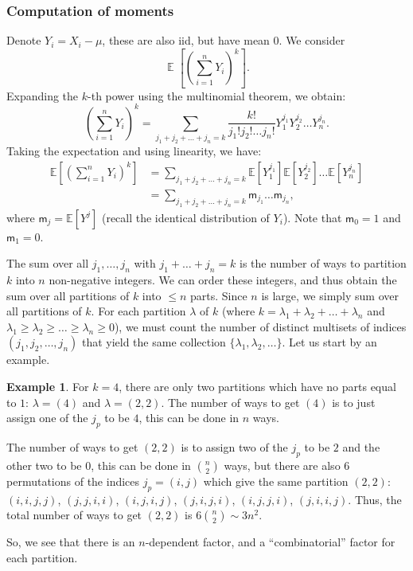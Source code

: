 \documentclass[letterpaper,11pt,oneside,reqno]{article}
\numberwithin{equation}{section}
\theoremstyle{definition}
\newtheorem{example}[proposition]{Example}
\begin{document}
\subsubsection{Computation of moments}

Denote $Y_i=X_i-\mu$, these are also iid, but have mean $0$.
We consider
\begin{equation*}
	\operatorname{\mathbb{E}}\left[ \left( \sum_{i=1}^n Y_i \right)^k \right].
\end{equation*}
Expanding the $k$-th power using the multinomial theorem, we obtain:
\begin{equation*}
\left( \sum_{i=1}^n Y_i \right)^k = \sum_{j_1 + j_2 + \dots + j_n = k} \frac{k!}{j_1! j_2! \dots j_n!} Y_1^{j_1} Y_2^{j_2} \dots Y_n^{j_n}.
\end{equation*}
Taking the expectation and using linearity, we have:
\begin{align*}
 \mathbb{E}\left[ \left( \sum_{i=1}^n Y_i \right)^k \right]
 &=
 \sum_{j_1 + j_2 + \dots + j_n = k}
 \mathbb{E}\left[Y_1^{j_1}\right]
 \mathbb{E}\left[Y_2^{j_2}\right] \dots
 \mathbb{E}\left[Y_n^{j_n}\right] \\
 &=
 \sum_{j_1 + j_2 + \dots + j_n = k}
 \mathsf{m}_{j_1}\ldots \mathsf{m}_{j_n},
\end{align*}
where $\mathsf{m}_j=\mathbb{E}[Y^j]$ (recall the identical distribution of $Y_i$).
Note that
$\mathsf{m}_0 = 1$ and
$\mathsf{m}_1 = 0$.

The sum over all $j_1, \ldots, j_n$ with $j_1 + \ldots + j_n = k$ is the number of ways to partition $k$ into $n$ non-negative integers.
We can order these integers, and thus
obtain the sum over all partitions of $k$ into $\le n$ parts.
Since $n$ is large, we simply sum over all partitions of $k$.
For each partition $\lambda$ of $k$
(where $k=\lambda_1+\lambda_2+\ldots+\lambda_n $ and
$\lambda_1\geq \lambda_2\geq \ldots\geq \lambda_n\geq 0$),
we must count the number of distinct multisets of indices
\((j_1,j_2,\ldots,j_n)\) that yield the same collection
\(\{\lambda_1,\lambda_2,\ldots\}\). Let us start by an
example.
\begin{example}
	For $k=4$, there are only two partitions
	which have no parts equal to $1$:
	$\lambda=(4)$ and $\lambda=(2,2)$.
	The number of ways to get $(4)$ is to just
	assign one of the $j_p$ to be $4$,
	this can be done in $n$ ways.

	The number of ways to get $(2,2)$ is to assign
	two of the $j_p$ to be $2$ and the other two to be $0$, this can be done in $\binom{n}{2}$ ways,
	but there are also 6 permutations of the indices
	$j_p=(i,j)$ which give the same partition $(2,2)$:
	$(i,i,j,j)$, $(j,j,i,i)$, $(i,j,i,j)$, $(j,i,j,i)$, $(i,j,j,i)$, $(j,i,i,j)$.
	Thus, the total number of ways to get $(2,2)$ is $6\binom{n}{2}\sim 3n^2$.

	So, we see that there is an $n$-dependent factor,
	and a ``combinatorial'' factor for each partition.
\end{example}
\end{document}

